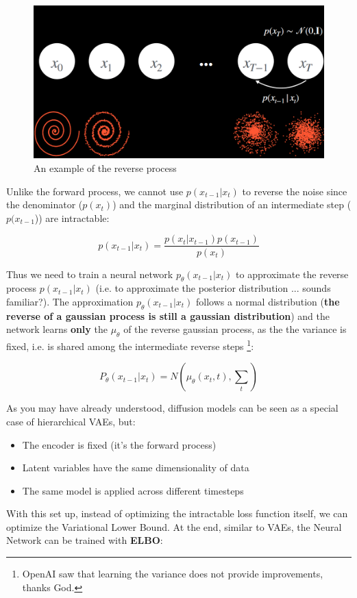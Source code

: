 \begin{figure}[H]
    \centering
    \includegraphics[width=0.75\linewidth]{tikz/Reverse process.png}
    \caption{An example of the reverse process}
    \label{fig:reverse-process}
\end{figure}

Unlike the forward process, we cannot use $p(x_{t-1}|x_t)$ to reverse the noise since the denominator ($p(x_t)$) and the marginal distribution of an intermediate step ($p(x_{t-1}$)) are intractable:

$$p(x_{t-1}|x_t)=\frac{p(x_t|x_{t-1})p(x_{t-1})}{p(x_t)}$$

Thus we need to train a neural network $p_{\theta}(x_{t-1}|x_{t})$ to approximate the reverse process $p(x_{t-1}|x_t)$ (i.e. to approximate the posterior distribution ... sounds familiar?). The approximation $p_{\theta}(x_{t-1}|x_{t})$ follows a normal distribution (\textbf{the reverse of a gaussian process is still a gaussian distribution}) and the network learns \textbf{only} the $\mu_{\theta}$ of the reverse gaussian process, as the the variance is fixed, i.e. is shared among the intermediate reverse steps \footnote{OpenAI saw that learning the variance does not provide improvements, thanks God.}: 

$$P_{\theta}(x_{t-1}|x_t) = N(\mu_{\theta}(x_t,t), \sum_{t})$$

As you may have already understood, diffusion models can be seen as a special case of hierarchical VAEs, but:
\begin{itemize}
    \item The encoder is fixed (it’s the forward process)
    \item Latent variables have the same dimensionality of data

    \item The same model is applied across different
timesteps
\end{itemize}

With this set up, instead of optimizing the intractable loss function itself, we can optimize the Variational Lower Bound. At the end, similar to VAEs, the Neural Network can be trained with \textbf{ELBO}:


